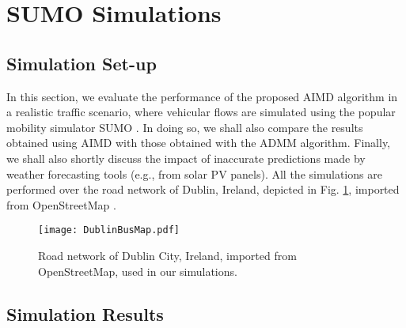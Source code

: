 \documentclass[journal]{IEEEtran}
\begin{document}
\section{SUMO Simulations}

\subsection{Simulation Set-up}

In this section, we evaluate the performance of the proposed AIMD algorithm in a realistic traffic scenario, where vehicular flows are simulated using the popular mobility simulator SUMO \cite{SUMORef}. In doing so, we shall also compare the results obtained using AIMD with those obtained with the ADMM algorithm. Finally, we shall also shortly discuss the impact of inaccurate predictions made by weather forecasting tools (e.g., from solar PV panels). All the simulations are performed over the road network of Dublin, Ireland, depicted in Fig. \ref{DublinMap}, imported from OpenStreetMap \cite{openstreetmap}. 
\begin{figure}[htbp]
	\begin{center}
		{\texttt{[image: DublinBusMap.pdf]}}
		\caption{Road network of Dublin City, Ireland, imported from OpenStreetMap, used in our simulations.}
		\label{DublinMap}
	\end{center}
\end{figure}



\subsection{Simulation Results}
\end{document}
